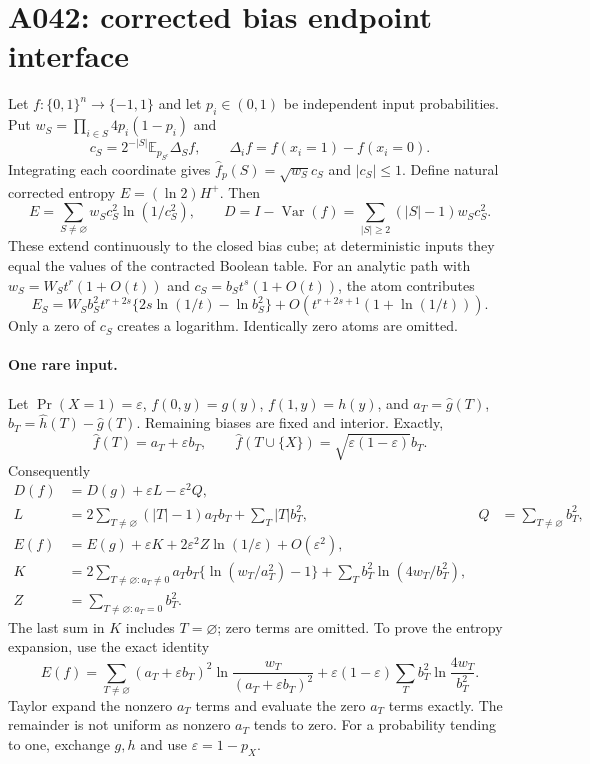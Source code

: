 \documentclass{article}
\newcommand{\D}{\Delta}
\begin{document}
\section*{A042: corrected bias endpoint interface}
Let $f:\{0,1\}^n\to\{-1,1\}$ and let $p_i\in(0,1)$ be independent
input probabilities. Put $w_S=\prod_{i\in S}4p_i(1-p_i)$ and
\[
 c_S=2^{-|S|}\mathbb E_{p_{S^c}}\D_S f,
 \qquad \D_i f=f(x_i=1)-f(x_i=0).
\]
Integrating each coordinate gives $\widehat f_p(S)=\sqrt{w_S}c_S$
and $|c_S|\le1$. Define natural corrected entropy $E=(\ln2)H^+$.
Then
\[
 E=\sum_{S\ne\varnothing}w_Sc_S^2\ln(1/c_S^2),\qquad
 D=I-\operatorname{Var}(f)=\sum_{|S|\ge2}(|S|-1)w_Sc_S^2.
\]
These extend continuously to the closed bias cube; at deterministic
inputs they equal the values of the contracted Boolean table.
For an analytic path with $w_S=W_St^r(1+O(t))$ and
$c_S=b_St^s(1+O(t))$, the atom contributes
\[
 E_S=W_Sb_S^2t^{r+2s}\{2s\ln(1/t)-\ln b_S^2\}
       +O(t^{r+2s+1}(1+\ln(1/t))).
\]
Only a zero of $c_S$ creates a logarithm. Identically zero atoms are omitted.

\paragraph{One rare input.}
Let $\Pr(X=1)=\varepsilon$, $f(0,y)=g(y)$, $f(1,y)=h(y)$, and
$a_T=\widehat g(T)$, $b_T=\widehat h(T)-\widehat g(T)$.
Remaining biases are fixed and interior. Exactly,
\[
 \widehat f(T)=a_T+\varepsilon b_T,\qquad
 \widehat f(T\cup\{X\})=\sqrt{\varepsilon(1-\varepsilon)}b_T.
\]
Consequently
\begin{align*}
 D(f)&=D(g)+\varepsilon L-\varepsilon^2Q,\\
 L&=2\sum_{T\ne\varnothing}(|T|-1)a_Tb_T+\sum_T|T|b_T^2,
 &Q&=\sum_{T\ne\varnothing}b_T^2,\\
 E(f)&=E(g)+\varepsilon K+2\varepsilon^2Z\ln(1/\varepsilon)
                +O(\varepsilon^2),\\
 K&=2\sum_{T\ne\varnothing:a_T\ne0}a_Tb_T
                \{\ln(w_T/a_T^2)-1\}
        +\sum_Tb_T^2\ln(4w_T/b_T^2),\\
 Z&=\sum_{T\ne\varnothing:a_T=0}b_T^2.
\end{align*}
The last sum in $K$ includes $T=\varnothing$; zero terms are omitted.
To prove the entropy expansion, use the exact identity
\[
 E(f)=\sum_{T\ne\varnothing}(a_T+\varepsilon b_T)^2
       \ln\frac{w_T}{(a_T+\varepsilon b_T)^2}
   +\varepsilon(1-\varepsilon)\sum_Tb_T^2\ln\frac{4w_T}{b_T^2}.
\]
Taylor expand the nonzero $a_T$ terms and evaluate the zero $a_T$ terms
exactly. The remainder is not uniform as nonzero $a_T$ tends to zero.
For a probability tending to one, exchange $g,h$ and use
$\varepsilon=1-p_X$.
\end{document}
